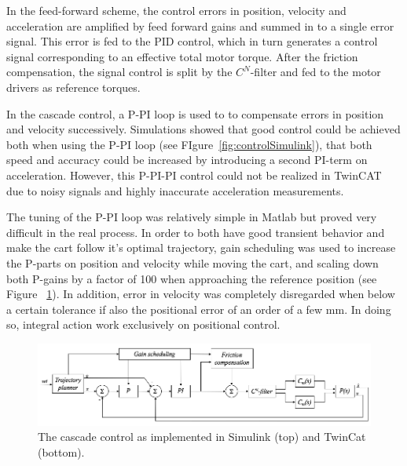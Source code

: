 \documentclass{article}
\begin{document}
In the feed-forward scheme, the control errors in position, velocity and acceleration are amplified by feed forward gains and summed in to a single error signal. This error is fed to the PID control, which in turn generates a control signal corresponding to an effective total motor torque. After the friction compensation, the signal control is split by the $C^N$-filter and fed to the motor drivers as reference torques.

In the cascade control, a P-PI loop is used to to compensate errors in position and velocity successively. Simulations showed that good control could be achieved both when using the P-PI loop (see FIgure~\ref{fig:controlSimulink}), that both speed and accuracy could be increased by introducing a second PI-term on acceleration. However, this P-PI-PI control could not be realized in TwinCAT due to noisy signals and highly inaccurate acceleration measurements. 

The tuning of the P-PI loop was relatively simple in Matlab but proved very difficult in the real process. In order to both have good transient behavior and make the cart follow it's optimal trajectory, gain scheduling was used to increase the P-parts on position and velocity while moving the cart, and scaling down both P-gains by a factor of 100 when approaching the reference position (see Figure ~\ref{fig:CascadeControl}). In addition, error in velocity was completely disregarded when below a certain tolerance if also the positional error of an order of a few mm. In doing so, integral action work exclusively on positional control.

\begin{figure}
\centering
\includegraphics[width = 0.8\linewidth]{figures/CascadeTwincat.png}
\caption{The cascade control as implemented in Simulink (top) and TwinCat (bottom).}
\label{fig:CascadeControl}
\end{figure}
\end{document}
